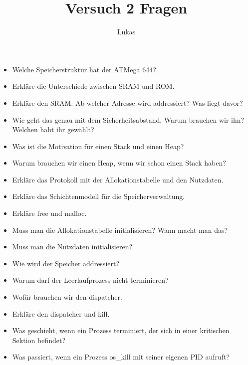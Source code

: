\documentclass[12pt]{article}
\title{Versuch 2 Fragen}
\author{Lukas}
\begin{document}
\maketitle

\begin{itemize}
    \item Welche Speicherstruktur hat der ATMega 644? 
    \item Erkläre die Unterschiede zwischen SRAM und ROM.
    \item Erkläre den SRAM. Ab welcher Adresse wird addressiert? Was liegt davor?
    \item Wie geht das genau mit dem Sicherheitsabstand. Warum brauchen wir ihn? Welchen habt ihr gewählt?
    \item Was ist die Motivation für einen Stack und einen Heap?
    \item Warum brauchen wir einen Heap, wenn wir schon einen Stack haben?
    \item Erkläre das Protokoll mit der Allokationstabelle und den Nutzdaten.
    \item Erkläre das Schichtenmodell für die Speicherverwaltung.
    \item Erkläre free und malloc.
    \item Muss man die Allokationstabelle initialisieren? Wann macht man das?
    \item Muss man die Nutzdaten initialisieren?
    \item Wie wird der Speicher addressiert?
    \item Warum darf der Leerlaufprozess nicht terminieren?
    \item Wofür brauchen wir den dispatcher.
    \item Erkläre den dispatcher und kill.
    \item Was geschieht, wenn ein Prozess terminiert, der sich in einer kritischen Sektion befindet?
    \item Was passiert, wenn ein Prozess os_kill  mit seiner eigenen PID aufruft?
\end{itemize}
\end{document}

